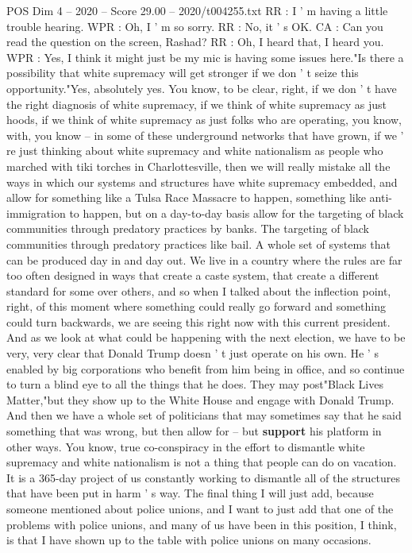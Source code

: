 \begin{textsample}{POS Dim 4 – 2020 – Score 29.00 – 2020/t004255.txt}
RR : I ' m having a little trouble hearing.
WPR : Oh, I ' m so sorry.
RR : No, it ' s OK.
CA : Can you read the question on the screen, Rashad?
RR : Oh, I heard that, I heard you.
WPR : Yes, I think it might just be my mic is having some issues here."Is there a possibility that white supremacy will get stronger if we don ' t seize this opportunity."Yes, absolutely yes.
You know, to be clear, right, if we don ' t have the right diagnosis of white supremacy, if we think of white supremacy as just hoods, if we think of white supremacy as just folks who are operating, you know, with, you know -- in some of these underground networks that have grown, if we ' re just thinking about white supremacy and white nationalism as people who marched with tiki torches in Charlottesville, then we will really mistake all the ways in which our systems and structures have white supremacy embedded, and allow for something like a Tulsa Race Massacre to happen, something like anti-immigration to happen, but on a day-to-day basis allow for the targeting of black communities through predatory practices by banks.
The targeting of black communities through predatory practices like bail.
A whole set of systems that can be produced day in and day out.
We live in a country where the rules are far too often designed in ways that create a caste system, that create a different standard for some over others, and so when I talked about the inflection point, right, of this moment where something could really go forward and something could turn backwards, we are seeing this right now with this current president.
And as we look at what could be happening with the next election, we have to be very, very clear that Donald Trump doesn ' t just operate on his own.
He ' s enabled by big corporations who benefit from him being in office, and so continue to turn a blind eye to all the things that he does.
They may post"Black Lives Matter,"but they show up to the White House and engage with Donald Trump.
And then we have a whole set of politicians that may sometimes say that he said something that was wrong, but then allow for -- but \textbf{support} his platform in other ways.
You know, true co-conspiracy in the effort to dismantle white supremacy and white nationalism is not a thing that people can do on vacation.
It is a 365-day project of us constantly working to dismantle all of the structures that have been put in harm ' s way.
The final thing I will just add, because someone mentioned about police unions, and I want to just add that one of the problems with police unions, and many of us have been in this position, I think, is that I have shown up to the table with police unions on many occasions.

\end{textsample}

